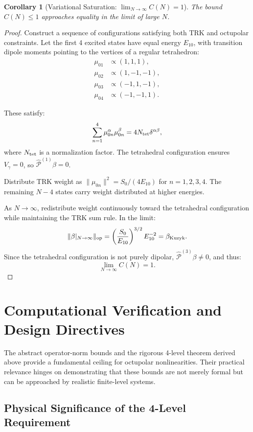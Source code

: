 \documentclass[11pt]{article}
\newcommand{\Proj}[1]{\hat{\mathcal{P}}^{(#1)}}
\newtheorem{corollary}[theorem]{Corollary}
\begin{document}
\begin{corollary}[Variational Saturation: $\lim_{N\to\infty}C(N)=1$]
\label{cor:saturation}
The bound $C(N) \le 1$ approaches equality in the limit of large $N$.
\end{corollary}

\begin{proof}
Construct a sequence of configurations satisfying both TRK and octupolar constraints. Let the first 4 excited states have equal energy $E_{10}$, with transition dipole moments pointing to the vertices of a regular tetrahedron:
\begin{align}
\mu_{01} &\propto (1, 1, 1), \\
\mu_{02} &\propto (1, -1, -1), \\
\mu_{03} &\propto (-1, 1, -1), \\
\mu_{04} &\propto (-1, -1, 1).
\end{align}

These satisfy:
\[
\sum_{n=1}^4 \mu_{0n}^\alpha \mu_{0n}^\beta = 4 N_{\rm tet} \delta^{\alpha\beta},
\]
where $N_{\rm tet}$ is a normalization factor. The tetrahedral configuration ensures $V_\gamma = 0$, so $\Proj{1}\beta = 0$.

Distribute TRK weight as $\|\mu_{0n}\|^2 = S_0/(4E_{10})$ for $n=1,2,3,4$. The remaining $N-4$ states carry weight distributed at higher energies.

As $N \to \infty$, redistribute weight continuously toward the tetrahedral configuration while maintaining the TRK sum rule. In the limit:
\[
\|\beta|_{N \to \infty}\|_{\rm op} = \left(\frac{S_0}{E_{10}}\right)^{3/2} E_{10}^{-2} = \beta_{\rm Kuzyk}.
\]
Since the tetrahedral configuration is not purely dipolar, $\Proj{3}\beta \ne 0$, and thus:
\[
\lim_{N\to\infty} C(N) = 1.
\]
\end{proof}

\section{Computational Verification and Design Directives}

The abstract operator-norm bounds and the rigorous 4-level theorem derived above provide a fundamental ceiling for octupolar nonlinearities. Their practical relevance hinges on demonstrating that these bounds are not merely formal but can be approached by realistic finite-level systems.

\subsection{Physical Significance of the 4-Level Requirement}
\end{document}
